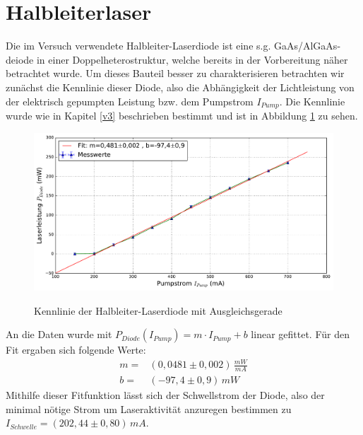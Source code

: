 \documentclass[twoside,colorback,accentcolor=tud4c,11pt]{tudreport}
\begin{document}
\section{Halbleiterlaser}
Die im Versuch verwendete Halbleiter-Laserdiode ist eine s.g. GaAs/AlGaAs-deiode in einer Doppelheterostruktur, welche bereits in der Vorbereitung näher betrachtet wurde. Um dieses Bauteil besser zu charakterisieren betrachten wir zunächst die Kennlinie dieser Diode, also die Abhängigkeit der Lichtleistung von der elektrisch gepumpten Leistung bzw. dem Pumpstrom $I_{Pump}$. Die Kennlinie wurde wie in Kapitel \ref{v3} beschrieben bestimmt und ist in Abbildung \ref{kd} zu sehen.
\begin{figure}[H]
\centering
   	\begin{minipage}[b]{0.85\textwidth}
   	\includegraphics[width=\textwidth]{graphics/kennlinie_diode.pdf}
  	\label{kd}
   	\end{minipage}
\caption{Kennlinie der Halbleiter-Laserdiode mit Ausgleichsgerade}	
\end{figure}
An die Daten wurde mit $P_{Diode}(I_{Pump})=m\cdot I_{Pump} +b $ linear gefittet. Für den Fit ergaben sich folgende Werte:
\begin{align}
m=& (0,0481 \pm 0,002)\,\si{\frac{mW}{mA}}\\
b=& (-97,4 \pm 0,9)\,\si{mW}
\end{align}
Mithilfe dieser Fitfunktion lässt sich der Schwellstrom der Diode, also der minimal nötige Strom um Laseraktivität anzuregen bestimmen zu $I_{Schwelle}=(202,44\pm 0,80)\,\si{mA}$.\\
\end{document}
